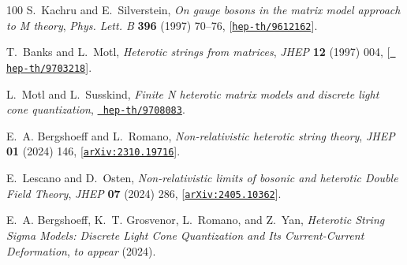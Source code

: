 \documentclass[11pt]{article}
\begin{document}
\begin{thebibliography}{100}
S.~Kachru and E.~Silverstein, {\it {On gauge bosons in the matrix model
  approach to M theory}},  {\em Phys. Lett. B} {\bf 396} (1997) 70--76,
  [\href{http://arxiv.org/abs/hep-th/9612162}{{\tt hep-th/9612162}}].

T.~Banks and L.~Motl, {\it {Heterotic strings from matrices}},  {\em JHEP} {\bf
  12} (1997) 004, [\href{http://arxiv.org/abs/hep-th/9703218}{{\tt
  hep-th/9703218}}].

L.~Motl and L.~Susskind, {\it {Finite N heterotic matrix models and discrete
  light cone quantization}},  \href{http://arxiv.org/abs/hep-th/9708083}{{\tt
  hep-th/9708083}}.

E.~A. Bergshoeff and L.~Romano, {\it {Non-relativistic heterotic string
  theory}},  {\em JHEP} {\bf 01} (2024) 146,
  [\href{http://arxiv.org/abs/2310.19716}{{\tt arXiv:2310.19716}}].

E.~Lescano and D.~Osten, {\it {Non-relativistic limits of bosonic and heterotic
  Double Field Theory}},  {\em JHEP} {\bf 07} (2024) 286,
  [\href{http://arxiv.org/abs/2405.10362}{{\tt arXiv:2405.10362}}].

E.~A. Bergshoeff, K.~T. Grosvenor, L.~Romano, and Z.~Yan, {\it {Heterotic
  String Sigma Models: Discrete Light Cone Quantization and Its Current-Current
  Deformation}},  {\em to appear} (2024).

\end{thebibliography}\endgroup
\end{document}
